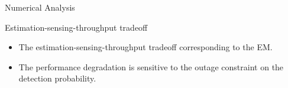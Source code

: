 \documentclass[12pt]{beamer}
\newcommand{\fs}[2]{\fontsize{#1 pt}{#2}\selectfont}
\begin{document}
\begin{frame}{Numerical Analysis}
        \begin{overlayarea}{\textwidth}{6.0cm}
        \begin{center}
                \fs{8}{8}
                Estimation-sensing-throughput tradeoff \\
                
                \centering
        \end{center}
        \end{overlayarea}
        \fs{8}{8}
        \begin{itemize}
                \item The estimation-sensing-throughput tradeoff corresponding to the EM.
                \item The performance degradation is sensitive to the outage constraint on the detection probability.
        \end{itemize}
\end{frame}
\end{document}
